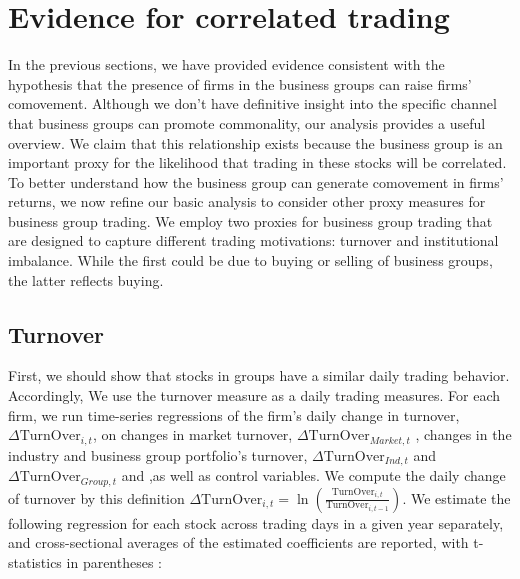 \section{{Evidence for correlated trading} }


	In the previous sections, we have provided evidence consistent with the hypothesis that the presence of firms in the business groups can raise firms' comovement. Although we don't have definitive insight into the specific channel that business groups can promote commonality, our analysis provides a useful overview.
	We claim that this relationship exists because the business group is an important proxy for the likelihood that trading in these stocks will be correlated. To better understand how the business group can generate comovement in firms' returns, we now refine our basic analysis to consider other proxy measures for business group trading.
	We employ two proxies for business group trading that are designed to capture different trading motivations: turnover and institutional imbalance. While the first could be due to buying or selling of business groups, the latter reflects buying.

		\captionsetup[subtable]{labelformat=parens, font = small}
			\renewcommand{\thesubtable}{\Alph{subtable}}

\subsection{{Turnover}}


	First, we should show that stocks in groups have a similar daily trading behavior. Accordingly, We use the turnover measure as a daily trading measures. For each firm, we run time-series regressions of the firm's daily change in turnover, $ \Delta \text{TurnOver}_{i,t} $, on changes in market turnover, $ \Delta\text{TurnOver}_{Market,t}   $ , changes in the industry and business group portfolio's turnover, $ \Delta\text{TurnOver}_{Ind,t} $ and  $\Delta \text{TurnOver}_{Group,t} $ and  ,as well as control variables.
	We compute the daily change of turnover by this definition $ \Delta \text{TurnOver}_{i,t} = \ln(\frac{\text{TurnOver}_{i,t}}{\text{TurnOver}_{i,t-1}}) $. 
	We estimate the following regression for each stock across trading days in a given year separately, and cross-sectional averages of the estimated coefficients are reported, with t-statistics in parentheses :
	
